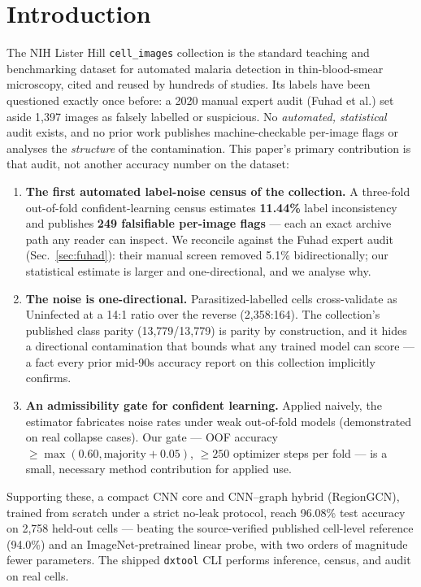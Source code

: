 
\section{Introduction}
The NIH Lister Hill \texttt{cell\_images} collection is the standard
teaching and benchmarking dataset for automated malaria detection in
thin-blood-smear microscopy, cited and reused by hundreds of studies.
Its labels have been questioned exactly once before: a 2020 manual expert
audit (Fuhad et al.) set aside 1{,}397 images as falsely labelled or
suspicious. No \emph{automated, statistical} audit exists, and no prior
work publishes machine-checkable per-image flags or analyses the
\emph{structure} of the contamination. This paper's primary contribution
is that audit, not another accuracy number on the dataset:
\begin{enumerate}
\item \textbf{The first automated label-noise census of the
collection.} A three-fold out-of-fold confident-learning census estimates
\textbf{11.44\%} label inconsistency and publishes \textbf{249
falsifiable per-image flags} --- each an exact archive path any reader can
inspect. We reconcile against the Fuhad expert audit (Sec.~\ref{sec:fuhad}):
their manual screen removed 5.1\% bidirectionally; our statistical
estimate is larger and one-directional, and we analyse why.
\item \textbf{The noise is one-directional.} Parasitized-labelled cells
cross-validate as Uninfected at a 14:1 ratio over the reverse
(2{,}358:164). The collection's published class parity (13{,}779/13{,}779)
is parity by construction, and it hides a directional contamination that
bounds what any trained model can score --- a fact every prior mid-90s
accuracy report on this collection implicitly confirms.
\item \textbf{An admissibility gate for confident learning.} Applied
naively, the estimator fabricates noise rates under weak out-of-fold
models (demonstrated on real collapse cases). Our gate --- OOF accuracy
$\ge \max(0.60, \text{majority}+0.05)$, $\ge 250$ optimizer steps per
fold --- is a small, necessary method contribution for applied use.
\end{enumerate}
Supporting these, a compact CNN core and CNN--graph hybrid (RegionGCN),
trained from scratch under a strict no-leak protocol, reach 96.08\% test
accuracy on 2{,}758 held-out cells --- beating the source-verified
published cell-level reference (94.0\%) and an ImageNet-pretrained
linear probe, with two orders of magnitude fewer parameters. The shipped
\texttt{dxtool} CLI performs inference, census, and audit on real cells.


